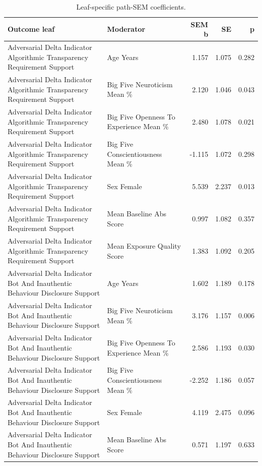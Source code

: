 \begin{table}[htbp]
\centering
\begin{threeparttable}
\caption{Leaf-specific path-SEM coefficients.}
\label{tab:sempaths}
\small
\setlength{\tabcolsep}{4.5pt}
\renewcommand{\arraystretch}{1.10}
\begin{tabular}{llrrr}
\toprule
Outcome leaf & Moderator & SEM b & SE & p \\
\midrule
Adversarial Delta Indicator Algorithmic Transparency Requirement Support & Age Years & 1.157 & 1.075 & 0.282 \\
Adversarial Delta Indicator Algorithmic Transparency Requirement Support & Big Five Neuroticism Mean \% & 2.120 & 1.046 & 0.043 \\
Adversarial Delta Indicator Algorithmic Transparency Requirement Support & Big Five Openness To Experience Mean \% & 2.480 & 1.078 & 0.021 \\
Adversarial Delta Indicator Algorithmic Transparency Requirement Support & Big Five Conscientiousness Mean \% & -1.115 & 1.072 & 0.298 \\
Adversarial Delta Indicator Algorithmic Transparency Requirement Support & Sex Female & 5.539 & 2.237 & 0.013 \\
Adversarial Delta Indicator Algorithmic Transparency Requirement Support & Mean Baseline Abs Score & 0.997 & 1.082 & 0.357 \\
Adversarial Delta Indicator Algorithmic Transparency Requirement Support & Mean Exposure Quality Score & 1.383 & 1.092 & 0.205 \\
Adversarial Delta Indicator Bot And Inauthentic Behaviour Disclosure Support & Age Years & 1.602 & 1.189 & 0.178 \\
Adversarial Delta Indicator Bot And Inauthentic Behaviour Disclosure Support & Big Five Neuroticism Mean \% & 3.176 & 1.157 & 0.006 \\
Adversarial Delta Indicator Bot And Inauthentic Behaviour Disclosure Support & Big Five Openness To Experience Mean \% & 2.586 & 1.193 & 0.030 \\
Adversarial Delta Indicator Bot And Inauthentic Behaviour Disclosure Support & Big Five Conscientiousness Mean \% & -2.252 & 1.186 & 0.057 \\
Adversarial Delta Indicator Bot And Inauthentic Behaviour Disclosure Support & Sex Female & 4.119 & 2.475 & 0.096 \\
Adversarial Delta Indicator Bot And Inauthentic Behaviour Disclosure Support & Mean Baseline Abs Score & 0.571 & 1.197 & 0.633 \\

\end{tabular}
\end{threeparttable}
\end{table}
